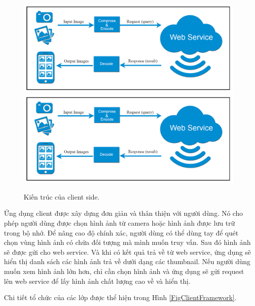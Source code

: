 {\begin{figure}[!htbp]
  \begin{center}
    \leavevmode
    \ifpdf
      \includegraphics[scale=0.25]{android_client}
    \else
      \includegraphics[scale=0.25]{android_client}
    \fi
    \caption[Kiến trúc của client side]{Kiến trúc của client side.}
    \label{FigAndroidClient}
  \end{center}
\end{figure}

Ứng dụng client được xây dựng đơn giản và thân thiện với người dùng. Nó cho phép người dùng được chọn hình ảnh từ camera hoặc hình ảnh được lưu trữ trong bộ nhớ. Để nâng cao độ chính xác, người dùng có thể dùng tay để quét chọn vùng hình ảnh có chứa đối tượng mà mình muốn truy vấn. Sau đó hình ảnh sẽ được gửi cho web service. Và khi có kết quả trả về từ web service, ứng dụng sẽ hiển thị danh sách các hình ảnh trả về dưới dạng các thumbnail. Nếu người dùng muốn xem hình ảnh lớn hơn, chỉ cần chọn hình ảnh và ứng dụng sẽ gửi request lên web service để lấy hình ảnh chất lượng cao về và hiển thị.

Chi tiết tổ chức của các lớp được thể hiện trong Hình \ref{FigClientFramework}.

}
